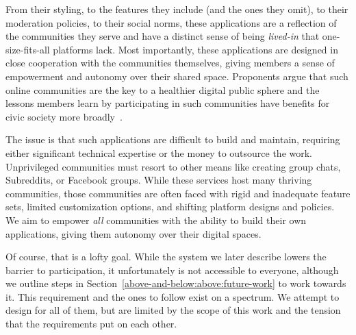 
%
From their styling, to the features they include (and the ones they omit),
to their moderation policies, to their social norms, these applications
are a reflection of the communities they serve and have a
distinct sense of being \emph{lived-in}
that one-size-fits-all platforms lack.
Most importantly, these applications are designed in close cooperation with the communities themselves,
giving members a sense of empowerment and autonomy over their shared space.
Proponents argue that such online communities are the key to a healthier
digital public sphere and the lessons members learn by participating in such
communities have benefits for civic society more broadly~\cite{threeleggedstool, runyourownsocial, archiveoftheirown}.

The issue is that such applications are difficult to build and maintain,
requiring either significant technical expertise or the money to outsource the work.
Unprivileged communities must resort to other means like creating group chats,
Subreddits, or Facebook groups. %
While these services host many thriving communities,
those communities are often faced with rigid and inadequate feature sets,
limited customization options, and shifting platform designs and policies.
We aim to empower \emph{all} communities with the ability to
build their own applications, giving them autonomy over their digital spaces.

Of course, that is a lofty goal. While the system
we later describe lowers the barrier to participation,
it unfortunately is not accessible to everyone, although
we outline steps in Section~\ref{above-and-below:above:future-work}
to work towards it.
This requirement and the ones to follow exist on a spectrum.
We attempt to design for all of them, but are limited by
the scope of this work and the tension that the requirements put
on each other.




